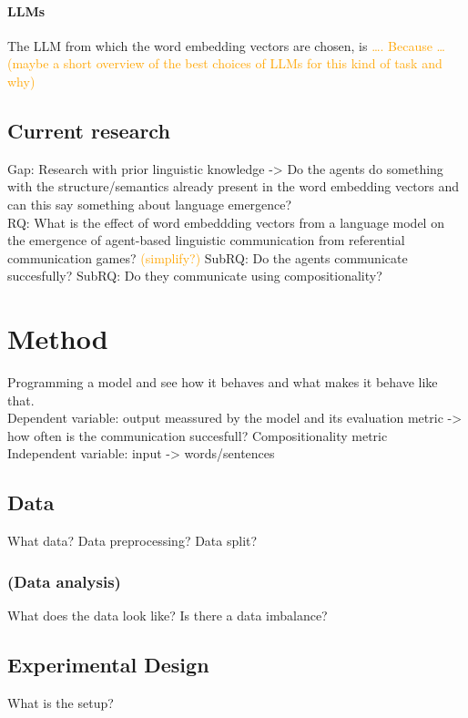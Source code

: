 \documentclass[a4paper, 12pt]{report}
\begin{document}
\subsubsection{LLMs}
The LLM from which the word embedding vectors are chosen, is \textcolor{orange}{\dots. Because \dots (maybe a short overview of the best choices of LLMs for this kind of task and why)}

\section{Current research}
Gap: Research with prior linguistic knowledge -> Do the agents do something with the structure/semantics already present in the word embedding vectors and can this say something about language emergence? \\
RQ: What is the effect of word embeddding vectors from a language model on the emergence of agent-based linguistic communication from referential communication games? \textcolor{orange}{(simplify?)}
SubRQ: Do the agents communicate succesfully?
SubRQ: Do they communicate using compositionality?


\chapter{Method}
Programming a model and see how it behaves and what makes it behave like that. \\
Dependent variable: output meassured by the model and its evaluation metric -> how often is the communication succesfull? Compositionality metric \\
Independent variable: input -> words/sentences \\

\section{Data}
What data? Data preprocessing? Data split?

\subsection{(Data analysis)}
What does the data look like? Is there a data imbalance?

\section{Experimental Design}
What is the setup?
\end{document}
